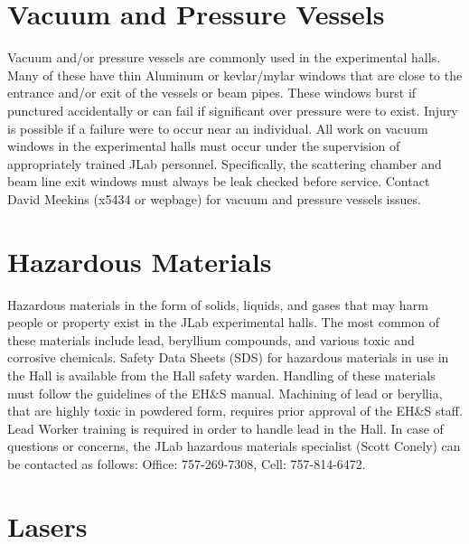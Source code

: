 \section{Vacuum and Pressure Vessels}

	Vacuum and/or pressure vessels are commonly used in the experimental halls. Many 
of these have thin Aluminum or kevlar/mylar windows that are close to the entrance 
and/or exit of the vessels or beam pipes. These windows burst if punctured accidentally 
or can fail if significant over pressure were to exist. Injury is possible if a failure 
were to occur near an individual. All work on vacuum windows in the experimental halls 
must occur under the supervision of appropriately trained JLab personnel. Specifically, 
the scattering chamber and beam line exit windows must always be leak checked before service. 
Contact David Meekins (x5434 or wepbage)  for vacuum and pressure vessels issues.

\section{Hazardous Materials}

	Hazardous materials in the form of solids, liquids, and gases that may harm people 
or property exist in the JLab experimental halls. The most common of these materials include 
lead, beryllium compounds, and various toxic and corrosive chemicals. 
Safety Data Sheets (SDS) for hazardous materials 
in use in the Hall is available from the Hall safety warden.  
Handling of these materials 
must follow the guidelines of the EH\&S manual. Machining of lead or beryllia, that 
are highly toxic in powdered form, requires prior approval of the EH\&S staff. 
Lead Worker training is required in order to handle lead in the Hall. 
In case of questions or concerns, the JLab hazardous materials specialist
(Scott Conely) 
can be contacted as follows: Office: 757-269-7308, Cell: 757-814-6472.

\section{Lasers}

